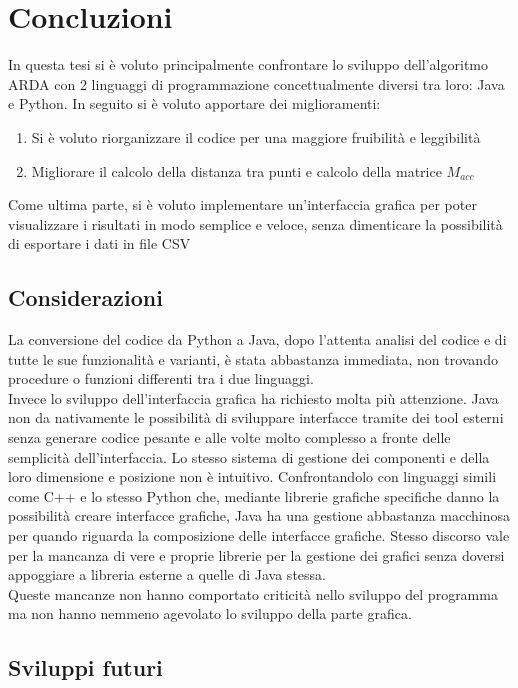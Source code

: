 \chapter{Concluzioni}
In questa tesi si \`e voluto principalmente confrontare lo sviluppo dell'algoritmo
ARDA con 2 linguaggi di programmazione concettualmente diversi tra loro: Java e Python.
In seguito si \`e voluto apportare dei miglioramenti:
\begin{enumerate}
    \item Si \`e voluto riorganizzare il codice per una maggiore fruibilit\`a e leggibilit\`a
    \item Migliorare il calcolo della distanza tra punti e calcolo della matrice $M_{acc}$
\end{enumerate}
Come ultima parte, si \`e voluto implementare un'interfaccia grafica per poter visualizzare
i risultati in modo semplice e veloce, senza dimenticare la possibilit\`a di esportare i
dati in file CSV

\section{Considerazioni}
La conversione del codice da Python a Java, dopo l'attenta analisi del codice e di tutte
le sue funzionalit\`a e varianti, \`e stata abbastanza immediata, non trovando procedure o
funzioni differenti tra i due linguaggi.\\
Invece lo sviluppo dell'interfaccia grafica ha richiesto molta pi\`u attenzione.
Java non da nativamente le possibilit\`a di sviluppare interfacce tramite dei tool esterni
senza generare codice pesante e alle volte molto complesso a fronte delle semplicit\`a dell'interfaccia.
Lo stesso sistema di gestione dei componenti e della loro dimensione e posizione non \`e
intuitivo. Confrontandolo con linguaggi simili come C++ e lo stesso Python che, mediante
librerie grafiche specifiche danno la possibilit\`a creare interfacce grafiche, Java ha una
gestione abbastanza macchinosa per quando riguarda la composizione delle interfacce grafiche.
Stesso discorso vale per la mancanza di vere e proprie librerie per la gestione dei grafici
senza doversi appoggiare a libreria esterne a quelle di Java stessa.\\
Queste mancanze non hanno comportato criticit\`a nello sviluppo del programma ma non hanno
nemmeno agevolato lo sviluppo della parte grafica.

\section{Sviluppi futuri}
